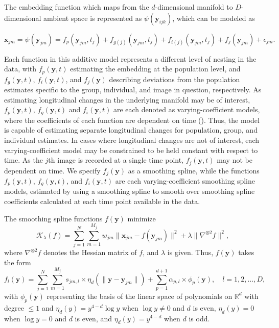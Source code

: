 \documentclass[11pt,reqno]{article}
\theoremstyle{definition}
\begin{document}
The embedding function which maps from the $d$-dimensional manifold to $D$-dimensional ambient space is represented as $\psi(\mathbf{y}_{ijk})$, which can be modeled as 

\begin{equation}
  \mathbf{x}_{jm} = \psi(\mathbf{y}_{jm}) = f_p(\mathbf{y}_{jm}, t_{j}) + f_{g(j)}(\mathbf{y}_{jm}, t_{j}) + f_{i(j)}(\mathbf{y}_{jm}, t_{j}) + f_j(\mathbf{y}_{jm}) + \epsilon_{jm}. \label{eq:2}
\end{equation}

Each function in this additive model represents a different level of nesting in the data, with $f_p(\mathbf{y}, t)$ estimating the embedding at the population level, and $f_g(\mathbf{y}, t)$, $f_i(\mathbf{y}, t)$, and $f_{j}(\mathbf{y})$ describing deviations from the population estimates specific to the group, individual, and image in question, respectively. As estimating longitudinal changes in the underlying manifold may be of interest, $f_p(\mathbf{y}, t)$, $f_g(\mathbf{y}, t)$ and $f_i(\mathbf{y}, t)$ are each denoted as varying-coefficient models, where the coefficients of each function are dependent on time (\cite{hastieVaryingCoefficientModels1993}). Thus, the model is capable of estimating separate longitudinal changes for population, group, and individual estimates. In cases where longitudinal changes are not of interest, each varying-coefficient model may be constrained to be held constant with respect to time. As the $j$th image is recorded at a single time point, $f_{j}(\mathbf{y}, t)$ may not be dependent on time. We specify $f_{j}(\mathbf{y})$ as a smoothing spline, while the functions $f_p(\mathbf{y}, t)$, $f_g(\mathbf{y}, t)$, and $f_i(\mathbf{y}, t)$ are each varying-coefficient smoothing spline models, estimated by using a smoothing spline to smooth over smoothing spline coefficients calculated at each time point available in the data. 

The smoothing spline functions $f(\mathbf{y})$ minimize 
\[%
  \mathcal{K}_{\lambda}(f) = \sum_{j=1}^{N}\sum_{m=1}^{M_j}w_{jm}\|\mathbf{x}_{jm} - f(\mathbf{y}_{jm})\|^2 + \lambda\|\nabla^{\otimes 2}f\|^2
,\]%
where $\nabla^{\otimes 2}f$ denotes the Hessian matrix of $f$, and $\lambda$ is given. Thus, $f(\mathbf{y})$ takes the form
\begin{equation}
  f_l(\mathbf{y}) = \sum_{j=1}^{N}\sum_{m=1}^{M_j}s_{jm, l} \times \eta_{d}\left(\|\mathbf{y} - \mathbf{y}_{jm}\|\right) + \sum_{p = 1}^{d + 1}\alpha_{p, l} \times \phi_{p}(\mathbf{y}), \quad l = 1, 2, \dots, D, \label{eq:3}
\end{equation}
with $\phi_p(\mathbf{y})$ representing the basis of the linear space of polynomials on $\mathbb{R}^{d}$ with degree $\leq 1$ and $\eta_{d}(y) = y^{4-d}\log y$ when $\log y \neq 0$ and $d$ is even, $\eta_{d}(y) = 0$ when $\log y = 0$ and $d$ is even, and $\eta_{d}(y) = y^{4-d}$ when $d$ is odd. 
\end{document}
